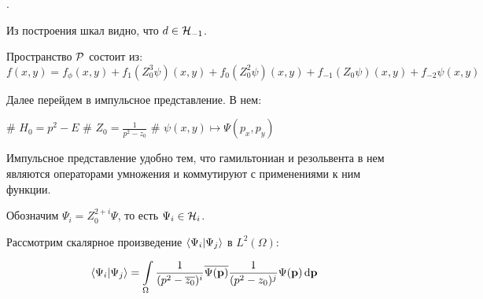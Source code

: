 .


Из построения шкал видно, что $d \in \mathcal{H}_{-1}$.

Пространство $\mathcal{P}$ состоит из:
\[
f(x, y) = f_\phi(x, y) + f_{1} (Z_0^3 \psi)(x, y) + f_{0} (Z_0^2 \psi)(x, y) + f_{-1} (Z_0 \psi)(x, y) + f_{-2} \psi(x, y)
\]

Далее перейдем в импульсное представление. В нем:

\begin{ilist}
# $H_0 = p^2 - E$
# $Z_0 = \frac{1}{p^2 - z_0}$
# $\psi(x, y) \mapsto \Psi(p_x, p_y)$
\end{ilist}

Импульсное представление удобно тем, что гамильтониан и резольвента в нем являются операторами умножения и коммутируют с применениями к ним функции.

Обозначим $\Psi_{i} = Z_0^{2 + i} \Psi$, то есть $\Psi_{i} \in \mathcal{H}_{i}$.

Рассмотрим скалярное произведение $\ip{\Psi_i}{\Psi_j}$ в $L^2(\Omega)$:

\begin{align*}
\ip{\Psi_i}{\Psi_j} = \int\limits_\Omega \frac{1}{(p^2 - \cconj{z_0})^i} \cconj{\Psi(\vb{p})} \frac{1}{(p^2 - z_0)^j} \Psi(\vb{p}) \dd{\vb{p}}
\end{align*}










